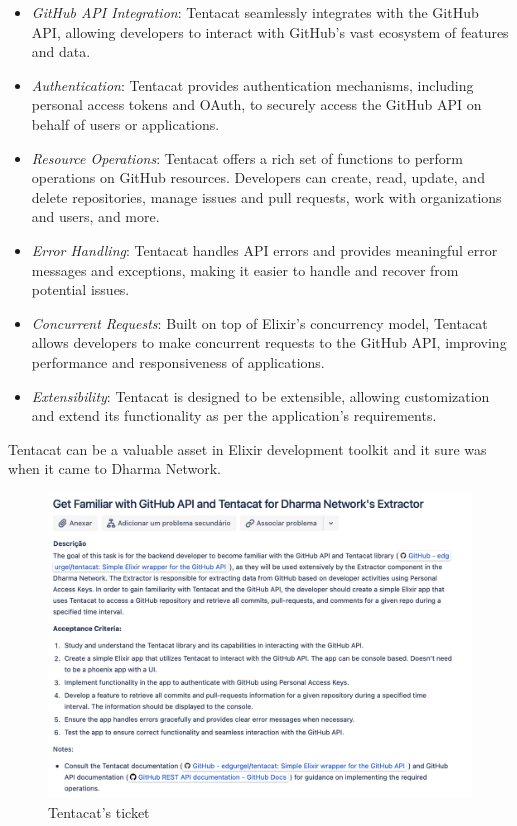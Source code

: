 \begin{itemize}
    \item \textit{GitHub API Integration}: Tentacat seamlessly integrates with the GitHub API, allowing developers to interact with GitHub's vast ecosystem of features and data.
    \item \textit{Authentication}: Tentacat provides authentication mechanisms, including personal access tokens and OAuth, to securely access the GitHub API on behalf of users or applications.
    \item \textit{Resource Operations}: Tentacat offers a rich set of functions to perform operations on GitHub resources. Developers can create, read, update, and delete repositories, manage issues and pull requests, work with organizations and users, and more.
    \item \textit{Error Handling}: Tentacat handles API errors and provides meaningful error messages and exceptions, making it easier to handle and recover from potential issues.
    \item \textit{Concurrent Requests}: Built on top of Elixir's concurrency model, Tentacat allows developers to make concurrent requests to the GitHub API, improving performance and responsiveness of applications.
    \item \textit{Extensibility}: Tentacat is designed to be extensible, allowing customization and extend its functionality as per the application's requirements.
    \cite{tentacat}
\end{itemize}

Tentacat can be a valuable asset in Elixir development toolkit and it sure was when it came to Dharma Network.

\begin{figure}[htbp]
	\centering
	\includegraphics[scale=0.5]{figures/ticket.png}  %
	\caption{Tentacat's ticket}
	\label{fig:ticket}
\end{figure}

